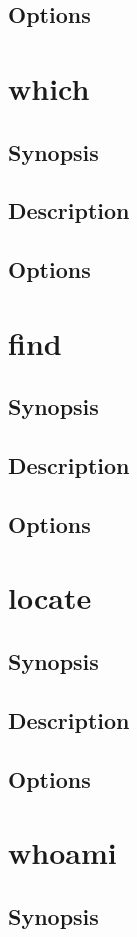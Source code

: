 \documentclass[a4paper, 10pt, onecolumn, openright, oneside]{book}
\begin{document}
			\subsection{Options}
		\section{which}
			\subsection{Synopsis}
			\subsection{Description}
			\subsection{Options}
		\section{find}
			\subsection{Synopsis}
			\subsection{Description}
			\subsection{Options}
		\section{locate}
			\subsection{Synopsis}
			\subsection{Description}
			\subsection{Options}
		\section{whoami}
			\subsection{Synopsis}
\end{document}
